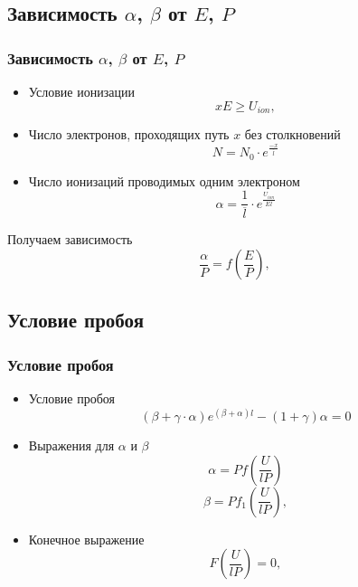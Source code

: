 \documentclass{beamer}
\begin{document}

\begin{frame}
\subsection{Зависимость $\alpha$,  $\beta$ от $E$, $P$}
\frametitle{Зависимость $\alpha$,  $\beta$ от $E$, $P$}

\begin{itemize}
\item Условие ионизации
\begin{equation*}
    xE \geq U_{ion},
\end{equation*}
\item Число электронов, проходящих путь $x$ без столкновений
\begin{equation*}
    N = N_0\cdot e^{\frac{-x}{\overline l}}
\end{equation*}
\item Число ионизаций проводимых одним электроном
\begin{equation*}
    \alpha = \frac{1}{\overline l}\cdot e^{\frac{U_{ion}}{E \overline l}}
\end{equation*}
\end{itemize}

\begin{block}{Получаем зависимость}
\begin{equation*}
    \frac{\alpha}{P} = f(\frac{E}{P}),
\end{equation*}
\end{block}

\end{frame}


\begin{frame}
\subsection{Условие пробоя}
\frametitle{Условие пробоя}

\begin{itemize}
\item Условие пробоя
\begin{equation}
    (\beta + \gamma \cdot \alpha)e^{(\beta + \alpha)l} - (1 + \gamma)\alpha = 0
\end{equation}
\item Выражения для $\alpha$ и $\beta$
\begin{equation*}
    \alpha = P f (\frac{U}{lP})
\end{equation*}
\begin{equation*}
    \beta = P f_1 (\frac{U}{lP}),
\end{equation*}
\item Конечное выражение
\begin{equation*}
    F(\frac{U}{lP}) = 0,
\end{equation*}
\end{itemize}

\end{frame}
\end{document}
